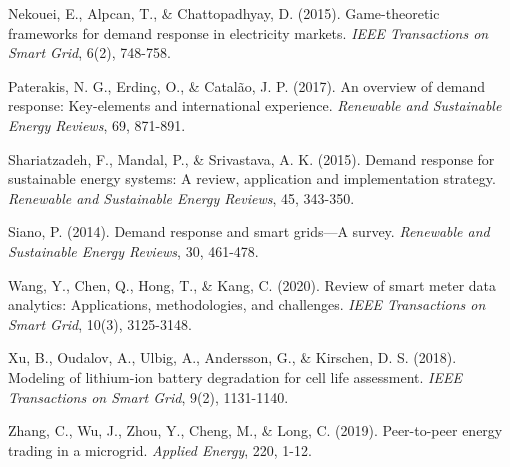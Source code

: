 \documentclass[11pt,a4paper]{article}
\begin{document}
\begin{thebibliography}{45}
Nekouei, E., Alpcan, T., \& Chattopadhyay, D. (2015).
\newblock Game-theoretic frameworks for demand response in electricity markets.
\newblock \emph{IEEE Transactions on Smart Grid}, 6(2), 748-758.

Paterakis, N. G., Erdinç, O., \& Catalão, J. P. (2017).
\newblock An overview of demand response: Key-elements and international experience.
\newblock \emph{Renewable and Sustainable Energy Reviews}, 69, 871-891.

Shariatzadeh, F., Mandal, P., \& Srivastava, A. K. (2015).
\newblock Demand response for sustainable energy systems: A review, application and implementation strategy.
\newblock \emph{Renewable and Sustainable Energy Reviews}, 45, 343-350.

Siano, P. (2014).
\newblock Demand response and smart grids—A survey.
\newblock \emph{Renewable and Sustainable Energy Reviews}, 30, 461-478.

Wang, Y., Chen, Q., Hong, T., \& Kang, C. (2020).
\newblock Review of smart meter data analytics: Applications, methodologies, and challenges.
\newblock \emph{IEEE Transactions on Smart Grid}, 10(3), 3125-3148.

Xu, B., Oudalov, A., Ulbig, A., Andersson, G., \& Kirschen, D. S. (2018).
\newblock Modeling of lithium-ion battery degradation for cell life assessment.
\newblock \emph{IEEE Transactions on Smart Grid}, 9(2), 1131-1140.

Zhang, C., Wu, J., Zhou, Y., Cheng, M., \& Long, C. (2019).
\newblock Peer-to-peer energy trading in a microgrid.
\newblock \emph{Applied Energy}, 220, 1-12.

\end{thebibliography}
\end{document}
